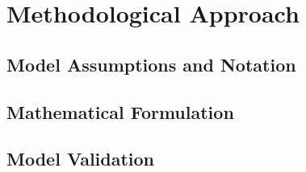 \section{Methodological Approach} %
\label{sec:methodological_approach}

\subsection{Model Assumptions and Notation} %
\label{sub:model_assumptions}


\subsection{Mathematical Formulation} %
\label{sub:mathematical_formulation}


\subsection{Model Validation} %
\label{sub:model_validation}


